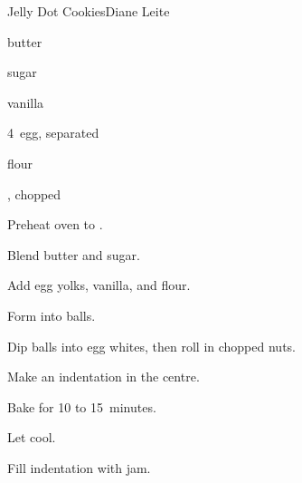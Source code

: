 \begin{recipe}{Jelly Dot Cookies}{Diane Leite}{}

\begin{ingredients}
\item {} butter
\item {} sugar
\item {} vanilla
\item 4~egg, separated
\item {} flour
\item {}, chopped
\item {}
\end{ingredients}

\begin{directions}
\item Preheat oven to .
\item Blend butter and sugar.
\item Add egg yolks, vanilla, and flour.
\item Form into balls.
\item Dip balls into egg whites, then roll in chopped nuts.
\item Make an indentation in the centre.
\item Bake for 10 to 15~minutes.
\item Let cool.
\item Fill indentation with jam.
\end{directions}

\end{recipe}
